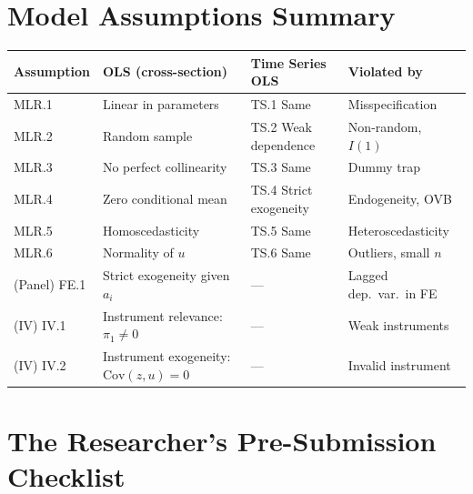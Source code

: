 \documentclass[10pt,a4paper]{article}
\begin{document}
\normalsize
\newpage

\section{Model Assumptions Summary}

\begin{center}
\small
\begin{tabularx}{\linewidth}{lXXl}
\toprule
\rowcolor{NavyBlue}
\color{white}\textbf{Assumption} &
\color{white}\textbf{OLS (cross-section)} &
\color{white}\textbf{Time Series OLS} &
\color{white}\textbf{Violated by} \\
\midrule
MLR.1 & Linear in parameters & TS.1 Same & Misspecification \\
\rowcolor{RowGray}
MLR.2 & Random sample & TS.2 Weak dependence & Non-random, $I(1)$ \\
MLR.3 & No perfect collinearity & TS.3 Same & Dummy trap \\
\rowcolor{RowGray}
MLR.4 & Zero conditional mean & TS.4 Strict exogeneity & Endogeneity, OVB \\
MLR.5 & Homoscedasticity & TS.5 Same & Heteroscedasticity \\
\rowcolor{RowGray}
MLR.6 & Normality of $u$ & TS.6 Same & Outliers, small $n$ \\
(Panel) FE.1 & Strict exogeneity given $a_i$ & --- & Lagged dep.\ var.\ in FE \\
\rowcolor{RowGray}
(IV) IV.1 & Instrument relevance: $\pi_1 \neq 0$ & --- & Weak instruments \\
(IV) IV.2 & Instrument exogeneity: $\text{Cov}(z,u)=0$ & --- & Invalid instrument \\
\bottomrule
\end{tabularx}
\end{center}

\section{The Researcher's Pre-Submission Checklist}
\end{document}
